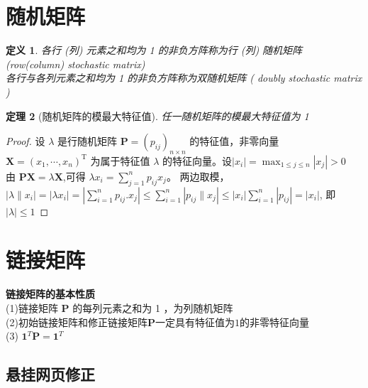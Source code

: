\documentclass[12pt, a4paper, oneside]{ctexbook}
\newtheorem{theorem}{定理}[section]
\newtheorem{definition}[theorem]{定义}
\begin{document}
\section{随机矩阵}
\begin{definition}
\noindent 各行 (列) 元素之和均为 1 的非负方阵称为行 (列) 随机矩阵 (row(column) stochastic matrix)\\
各行与各列元素之和均为 1 的非负方阵称为双随机矩阵 ( doubly stochastic matrix )
\end{definition}
\begin{theorem}[随机矩阵的模最大特征值]
    任一随机矩阵的模最大特征值为 1   
\end{theorem}
\begin{proof}
    设 $\lambda$ 是行随机矩阵 $\mathbf{P}=(p_{ij})_{n\times n}$ 的特征值，非零向量 $\mathbf{X} = ( x_1, \cdots , x_n) ^{\mathrm{T} }$ 为属于特征值 $\lambda$ 的特征向量。设$|x_i|=\max_{1\leq j\leq n}|x_j|>0$\\
    由 $\mathbf{PX}=\lambda\mathbf{X}$,可得 $\lambda x_i=\sum_{j=1}^np_{ij}x_j$。 两边取模，$|\lambda\|x_i|=|\lambda x_i|=\left|\sum_{i=1}^np_{ij}.x_j\right|\leq\sum_{i=1}^n|p_{ij}\|x_j|\leq|x_i|\sum_{i=1}^n|p_{ij}|=|x_i|$, 即$|\lambda|\leq1$
\end{proof}
\section{链接矩阵}
\noindent\textbf{链接矩阵的基本性质}\\
(1)链接矩阵 $\mathbf{P}$ 的每列元素之和为 1 ，为列随机矩阵\\
(2)初始链接矩阵和修正链接矩阵$\mathbf{P}$一定具有特征值为$1$的非零特征向量\\
(3)  $\mathbf{1}^T \mathbf{P} = \mathbf{1}^T$
\subsection{悬挂网页修正}
\end{document}
